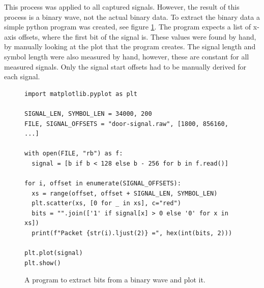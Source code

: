 This process was applied to all captured signals. However, the result of this process is a binary wave, not the actual binary data. To extract the binary data a simple python program was created, see figure \ref{lst:extract-bits}. The program expects a list of x-axis offsets, where the first bit of the signal is. These values were found by hand, by manually looking at the plot that the program creates. The signal length and symbol length were also measured by hand, however, these are constant for all measured signals. Only the signal start offsets had to be manually derived for each signal.
\begin{figure}[ht]
    \begin{verbatim}
import matplotlib.pyplot as plt

SIGNAL_LEN, SYMBOL_LEN = 34000, 200
FILE, SIGNAL_OFFSETS = "door-signal.raw", [1800, 856160, ...]

with open(FILE, "rb") as f:
  signal = [b if b < 128 else b - 256 for b in f.read()]

for i, offset in enumerate(SIGNAL_OFFSETS):
  xs = range(offset, offset + SIGNAL_LEN, SYMBOL_LEN)
  plt.scatter(xs, [0 for _ in xs], c="red")
  bits = "".join(['1' if signal[x] > 0 else '0' for x in xs])
  print(f"Packet {str(i).ljust(2)} =", hex(int(bits, 2)))

plt.plot(signal)
plt.show()
    \end{verbatim}
    \caption{A program to extract bits from a binary wave and plot it.}
    \label{lst:extract-bits}
\end{figure}

